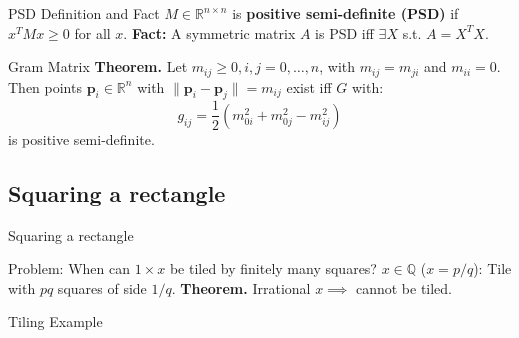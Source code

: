 \documentclass{beamer}
\begin{document}
\begin{frame}{PSD Definition and Fact}
    $M \in \mathbb{R}^{n \times n}$ is \textbf{positive semi-definite (PSD)} if $x^T M x \ge 0$ for all $x$.
    \vfill
    \textbf{Fact:} A symmetric matrix $A$ is PSD iff $\exists X$ s.t. $A = X^T X$.
\end{frame}


\begin{frame}{Gram Matrix}
    \textbf{Theorem.} Let $m_{ij} \ge 0, i, j = 0, \dots, n$, with $m_{ij} = m_{ji}$ and $m_{ii} = 0$.
    Then points $\mathbf{p}_i \in \mathbb{R}^n$ with $\|\mathbf{p}_i - \mathbf{p}_j\| = m_{ij}$ exist iff $G$ with:
    \[ g_{ij} = \frac{1}{2}(m_{0i}^2 + m_{0j}^2 - m_{ij}^2) \]
    is positive semi-definite.
\end{frame}
\begin{frame}{}
\end{frame}
\subsection{Squaring a rectangle}
\begin{frame}[fragile]{Squaring a rectangle}
    \begin{center}
    \end{center}
    Problem: When can $1 \times x$ be tiled by finitely many squares?
    \vfill
    $x \in \mathbb{Q}$ ($x=p/q$): Tile with $pq$ squares of side $1/q$.
    \vfill
    \textbf{Theorem.} Irrational $x \implies$ cannot be tiled.
\end{frame}
\begin{frame}{}
\end{frame}

\begin{frame}[fragile]{Tiling Example}
    \begin{center}
    \end{center}
\end{frame}
\end{document}
